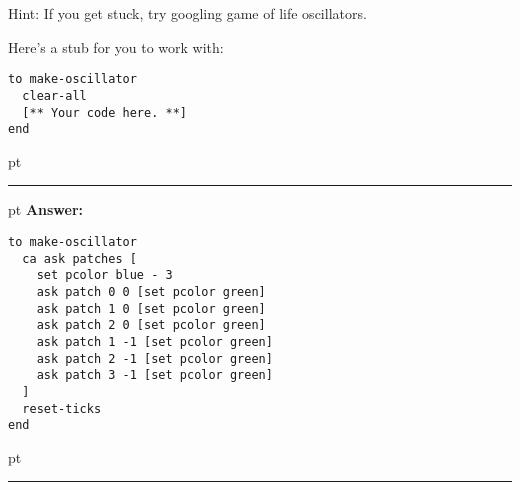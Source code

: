\documentclass[11pt,oneside]{book}
\begin{document}
\begin{enumerate}
Hint: If you get stuck, try googling game of life oscillators.

Here's a stub for you to work with:
\begin{verbatim}
to make-oscillator
  clear-all
  [** Your code here. **]
end
\end{verbatim}

\ifnum{}
 pt
\hrule
{} pt
{\bf Answer: }
\begin{verbatim}
to make-oscillator
  ca ask patches [
    set pcolor blue - 3
    ask patch 0 0 [set pcolor green]
    ask patch 1 0 [set pcolor green]
    ask patch 2 0 [set pcolor green]
    ask patch 1 -1 [set pcolor green]
    ask patch 2 -1 [set pcolor green]
    ask patch 3 -1 [set pcolor green]
  ]
  reset-ticks
end
\end{verbatim}
 pt
\hrule
\fi

\end{enumerate}
\end{document}
